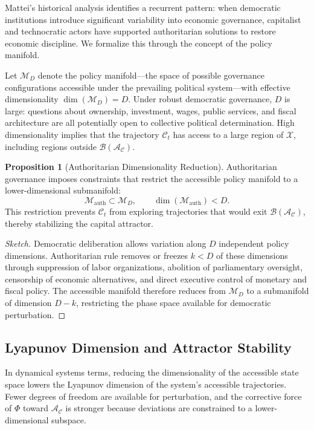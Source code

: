 \documentclass[12pt,a4paper]{article}
\theoremstyle{definition}
\newtheorem{proposition}{Proposition}[section]
\theoremstyle{remark}
\begin{document}
Mattei's historical analysis identifies a recurrent pattern: when democratic institutions introduce significant variability into economic governance, capitalist and technocratic actors have supported authoritarian solutions to restore economic discipline. We formalize this through the concept of the policy manifold.

Let $\mathcal{M}_D$ denote the policy manifold---the space of possible governance configurations accessible under the prevailing political system---with effective dimensionality $\dim(\mathcal{M}_D) = D$. Under robust democratic governance, $D$ is large: questions about ownership, investment, wages, public services, and fiscal architecture are all potentially open to collective political determination. High dimensionality implies that the trajectory $\mathcal{C}_t$ has access to a large region of $\mathcal{X}$, including regions outside $\mathcal{B}(\mathcal{A}_\mathcal{C})$.

\begin{proposition}[Authoritarian Dimensionality Reduction]
Authoritarian governance imposes constraints that restrict the accessible policy manifold to a lower-dimensional submanifold:
\begin{equation}
  \mathcal{M}_{\mathrm{auth}} \subset \mathcal{M}_D, \qquad
  \dim(\mathcal{M}_{\mathrm{auth}}) < D.
\end{equation}
This restriction prevents $\mathcal{C}_t$ from exploring trajectories that would exit $\mathcal{B}(\mathcal{A}_\mathcal{C})$, thereby stabilizing the capital attractor.
\end{proposition}

\begin{proof}[Sketch]
Democratic deliberation allows variation along $D$ independent policy dimensions. Authoritarian rule removes or freezes $k < D$ of these dimensions through suppression of labor organizations, abolition of parliamentary oversight, censorship of economic alternatives, and direct executive control of monetary and fiscal policy. The accessible manifold therefore reduces from $\mathcal{M}_D$ to a submanifold of dimension $D - k$, restricting the phase space available for democratic perturbation.
\end{proof}

\subsection{Lyapunov Dimension and Attractor Stability}

In dynamical systems terms, reducing the dimensionality of the accessible state space lowers the Lyapunov dimension of the system's accessible trajectories. Fewer degrees of freedom are available for perturbation, and the corrective force of $\Phi$ toward $\mathcal{A}_\mathcal{C}$ is stronger because deviations are constrained to a lower-dimensional subspace.
\end{document}
